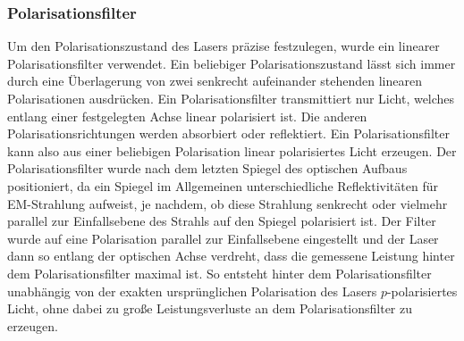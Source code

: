 \documentclass[titlepage,  ngerman]{article}
\begin{document}
	\subsubsection{Polarisationsfilter}	
	Um den Polarisationszustand des Lasers präzise festzulegen, wurde ein linearer Polarisationsfilter verwendet. Ein beliebiger Polarisationszustand lässt sich immer durch eine Überlagerung von zwei senkrecht aufeinander stehenden linearen Polarisationen ausdrücken. Ein Polarisationsfilter transmittiert nur Licht, welches entlang einer festgelegten Achse linear polarisiert ist. Die anderen Polarisationsrichtungen werden absorbiert oder reflektiert. Ein Polarisationsfilter kann also aus einer beliebigen Polarisation linear polarisiertes Licht erzeugen. Der  Polarisationsfilter wurde nach dem letzten Spiegel des optischen Aufbaus positioniert, da ein Spiegel im Allgemeinen unterschiedliche Reflektivitäten für EM-Strahlung aufweist, je nachdem, ob diese Strahlung senkrecht oder vielmehr parallel zur Einfallsebene des Strahls auf den Spiegel polarisiert ist. Der Filter wurde auf eine Polarisation parallel zur Einfallsebene eingestellt und der Laser dann so entlang der optischen Achse verdreht, dass die gemessene Leistung hinter dem Polarisationsfilter maximal ist. So entsteht hinter dem Polarisationsfilter unabhängig  von der exakten ursprünglichen Polarisation des Lasers $p$-polarisiertes Licht, ohne dabei zu große Leistungsverluste an dem Polarisationsfilter zu erzeugen.\cite{Hecht.2018}
\end{document}
